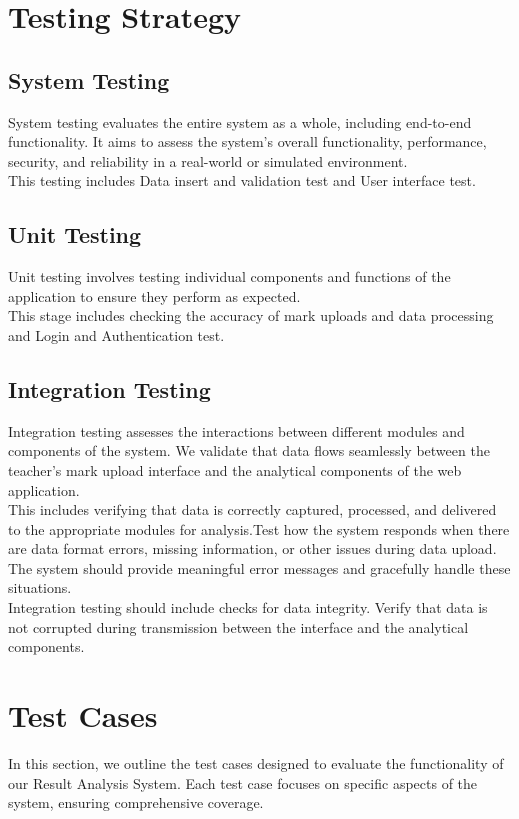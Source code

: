 \documentclass{nascproject}
\begin{document}
\section{Testing Strategy}
\subsection{System Testing}
System testing evaluates the entire system as a whole, including end-to-end functionality. It aims to assess the system's overall functionality, performance, security, and reliability in a real-world or simulated environment. \\
This testing includes Data insert and validation test and User interface test.
\subsection{Unit Testing}
Unit testing involves testing individual components and functions of the application to ensure they perform as expected.\\
This stage includes checking the accuracy of mark uploads and data processing and  Login and Authentication test.
\subsection{Integration Testing}
Integration testing assesses the interactions between different modules and components of the system. We validate that data flows seamlessly between the teacher's mark upload interface and the analytical components of the web application.\\
This includes verifying that data is correctly captured, processed, and delivered to the appropriate modules for analysis.Test how the system responds when there are data format errors, missing information, or other issues during data upload. The system should provide meaningful error messages and gracefully handle these situations.\\
Integration testing should include checks for data integrity. Verify that data is not corrupted during transmission between the interface and the analytical components.


\section{Test Cases}
In this section, we outline the test cases designed to evaluate the functionality of our Result Analysis System. Each test case focuses on specific aspects of the system, ensuring comprehensive coverage.
\end{document}
